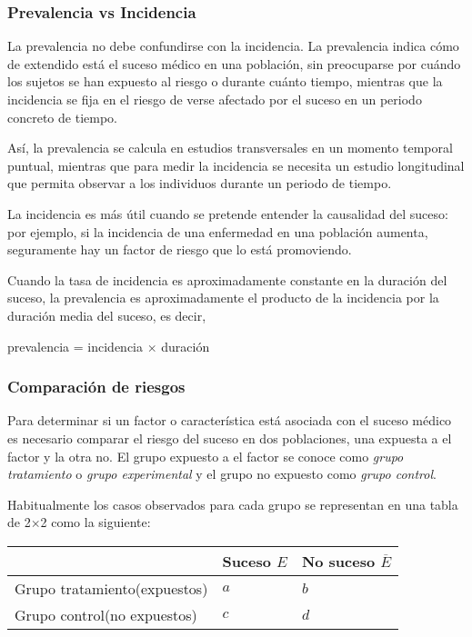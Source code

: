 \begin{frame}
\frametitle{Prevalencia vs Incidencia}
La prevalencia no debe confundirse con la incidencia. 
La prevalencia indica cómo de extendido está el suceso médico en una población, sin preocuparse por cuándo los sujetos se han expuesto al riesgo o durante cuánto tiempo, mientras que la incidencia se fija en el riesgo de verse afectado por el suceso en un periodo concreto de tiempo.

Así, la prevalencia se calcula en estudios transversales en un momento temporal puntual, mientras que para medir la incidencia se necesita un estudio longitudinal que permita observar a los individuos durante un periodo de tiempo.

La incidencia es más útil cuando se pretende entender la causalidad del suceso: por ejemplo, si la incidencia de una enfermedad en una población aumenta, seguramente hay un factor de riesgo que lo está promoviendo.

Cuando la tasa de incidencia es aproximadamente constante en la duración del suceso, la prevalencia es aproximadamente el producto de la incidencia por la duración media del suceso, es decir,
\begin{center}
  prevalencia = incidencia $\times$ duración
\end{center}
\end{frame}
  

\begin{frame}
\frametitle{Comparación de riesgos}
Para determinar si un factor o característica está asociada con el suceso médico es necesario comparar el riesgo del suceso en dos poblaciones, una expuesta a el factor y la otra no. 
El grupo expuesto a el factor se conoce como \emph{grupo tratamiento} o \emph{grupo experimental} y el grupo no expuesto como \emph{grupo control}.

Habitualmente los casos observados para cada grupo se representan en una tabla de 2$\times$2 como la siguiente:

\begin{center}
  \begin{tabular}{|m{3cm}|m{3cm}<{\centering}|m{3cm}<{\centering}|}
  \cline{2-3}
  \multicolumn{1}{c|}{} & Suceso $E$ & No suceso $\overline E$\\ 
  \hline
  Grupo tratamiento\newline (expuestos) & $a$ & $b$\\ 
  \hline 
  Grupo control\newline (no expuestos) & $c$ & $d$\\ 
  \hline
  \end{tabular}
\end{center}
\end{frame}
 

